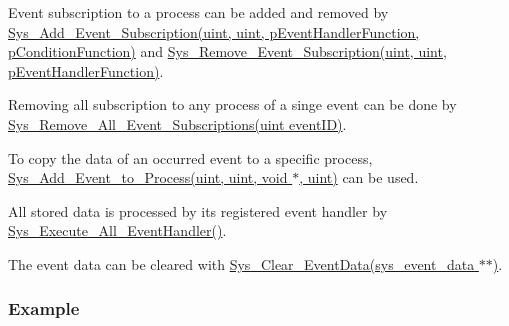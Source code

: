\begin{DoxyItemize}
\item Event subscription to a process can be added and removed by \hyperlink{process__Management_8h_aa84594222e7b081e9f7675721db4b71f}{Sys\+\_\+\+Add\+\_\+\+Event\+\_\+\+Subscription(uint, uint, p\+Event\+Handler\+Function, p\+Condition\+Function)} and \hyperlink{process__Management_8h_a0ec9fdba5ebf517a49d2ac38d662ebce}{Sys\+\_\+\+Remove\+\_\+\+Event\+\_\+\+Subscription(uint, uint, p\+Event\+Handler\+Function)}.
\item Removing all subscription to any process of a singe event can be done by \hyperlink{process__Management_8h_ad34bd4f154b25e45c5381e6f271d15ab}{Sys\+\_\+\+Remove\+\_\+\+All\+\_\+\+Event\+\_\+\+Subscriptions(uint event\+I\+D)}.
\item To copy the data of an occurred event to a specific process, \hyperlink{process__Management_8h_aa333c28860a6719936380076883766a3}{Sys\+\_\+\+Add\+\_\+\+Event\+\_\+to\+\_\+\+Process(uint, uint, void $\ast$, uint)} can be used.
\item All stored data is processed by its registered event handler by \hyperlink{process__Management_8h_a766e55607bcf327ec226b205fdde0a1e}{Sys\+\_\+\+Execute\+\_\+\+All\+\_\+\+Event\+Handler()}.
\item The event data can be cleared with \hyperlink{process__Management_8h_a4ce23b19b4229d1d0ba38d45a9f36bf8}{Sys\+\_\+\+Clear\+\_\+\+Event\+Data(sys\+\_\+event\+\_\+data $\ast$$\ast$)}.
\end{DoxyItemize}\hypertarget{group__process_process_example}{}\subsubsection{Example}\label{group__process_process_example}

